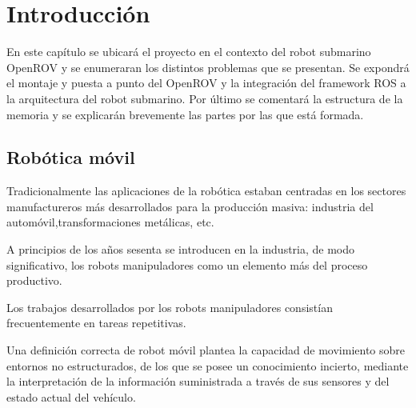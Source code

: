 \chapter{Introducción}

En este capítulo se ubicará el proyecto en el contexto del robot submarino OpenROV y se enumeraran los distintos problemas que se presentan.
Se expondrá el montaje y puesta a punto del OpenROV y la integración del framework ROS a la arquitectura del robot submarino.
Por último se comentará la estructura de la memoria y se explicarán brevemente las partes por las que está formada.

\section{Robótica móvil}
\label{cap:roboticamovil}
Tradicionalmente las aplicaciones de la robótica estaban centradas en los sectores manufactureros más desarrollados para la producción masiva: industria del automóvil,transformaciones metálicas, etc.

A principios de los años sesenta se introducen en la industria, de modo significativo, los robots manipuladores como un elemento más del proceso productivo.

Los trabajos desarrollados por los robots manipuladores consistían frecuentemente en tareas repetitivas.

Una definición correcta de robot móvil plantea la capacidad de movimiento sobre entornos no estructurados, de los que se posee un conocimiento incierto, mediante la interpretación de la información suministrada a través de sus sensores y del estado actual del vehículo. 

